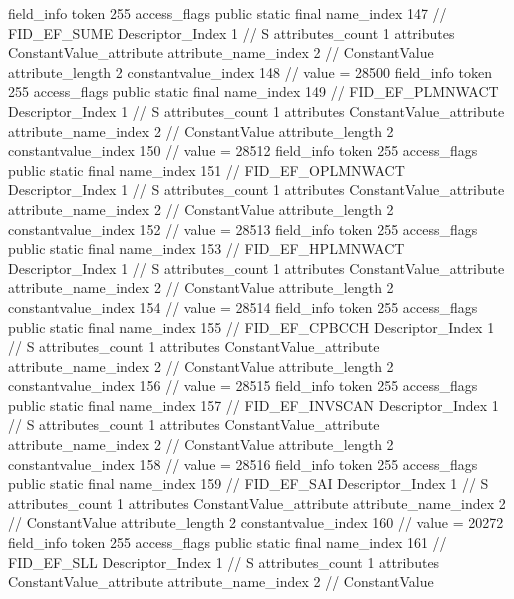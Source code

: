 {{{{{{{				}
				}
			}
			field_info {
				token	255
				access_flags	public static final
				name_index	147		// FID_EF_SUME
				Descriptor_Index	1		// S
				attributes_count	1
				attributes {
				ConstantValue_attribute {
					attribute_name_index	2		// ConstantValue
					attribute_length	2
					constantvalue_index	148		// value = 28500
				}
				}
			}
			field_info {
				token	255
				access_flags	public static final
				name_index	149		// FID_EF_PLMNWACT
				Descriptor_Index	1		// S
				attributes_count	1
				attributes {
				ConstantValue_attribute {
					attribute_name_index	2		// ConstantValue
					attribute_length	2
					constantvalue_index	150		// value = 28512
				}
				}
			}
			field_info {
				token	255
				access_flags	public static final
				name_index	151		// FID_EF_OPLMNWACT
				Descriptor_Index	1		// S
				attributes_count	1
				attributes {
				ConstantValue_attribute {
					attribute_name_index	2		// ConstantValue
					attribute_length	2
					constantvalue_index	152		// value = 28513
				}
				}
			}
			field_info {
				token	255
				access_flags	public static final
				name_index	153		// FID_EF_HPLMNWACT
				Descriptor_Index	1		// S
				attributes_count	1
				attributes {
				ConstantValue_attribute {
					attribute_name_index	2		// ConstantValue
					attribute_length	2
					constantvalue_index	154		// value = 28514
				}
				}
			}
			field_info {
				token	255
				access_flags	public static final
				name_index	155		// FID_EF_CPBCCH
				Descriptor_Index	1		// S
				attributes_count	1
				attributes {
				ConstantValue_attribute {
					attribute_name_index	2		// ConstantValue
					attribute_length	2
					constantvalue_index	156		// value = 28515
				}
				}
			}
			field_info {
				token	255
				access_flags	public static final
				name_index	157		// FID_EF_INVSCAN
				Descriptor_Index	1		// S
				attributes_count	1
				attributes {
				ConstantValue_attribute {
					attribute_name_index	2		// ConstantValue
					attribute_length	2
					constantvalue_index	158		// value = 28516
				}
				}
			}
			field_info {
				token	255
				access_flags	public static final
				name_index	159		// FID_EF_SAI
				Descriptor_Index	1		// S
				attributes_count	1
				attributes {
				ConstantValue_attribute {
					attribute_name_index	2		// ConstantValue
					attribute_length	2
					constantvalue_index	160		// value = 20272
				}
				}
			}
			field_info {
				token	255
				access_flags	public static final
				name_index	161		// FID_EF_SLL
				Descriptor_Index	1		// S
				attributes_count	1
				attributes {
				ConstantValue_attribute {
					attribute_name_index	2		// ConstantValue
}}}}}}}
